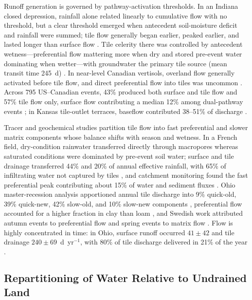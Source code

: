 Runoff generation is governed by pathway-activation thresholds. In an Indiana closed depression, rainfall alone related linearly to cumulative flow with no threshold, but a clear threshold emerged when antecedent soil-moisture deficit and rainfall were summed; tile flow generally began earlier, peaked earlier, and lasted longer than surface flow \parencite{Williams2019}. Tile celerity there was controlled by antecedent wetness---preferential flow mattering more when dry and stored pre-event water dominating when wetter---with groundwater the primary tile source (mean transit time 245~d) \parencite{Williams2021}. In near-level Canadian vertisols, overland flow generally activated before tile flow, and direct preferential flow into tiles was uncommon \parencite{Kokulan2019}. Across 795 US--Canadian events, 43\% produced both surface and tile flow and 57\% tile flow only, surface flow contributing a median 12\% among dual-pathway events \parencite{Macrae2019}; in Kansas tile-outlet terraces, baseflow contributed 38--51\% of discharge \parencite{Stops2022}.

Tracer and geochemical studies partition tile flow into fast preferential and slower matrix components whose balance shifts with season and wetness. In a French field, dry-condition rainwater transferred directly through macropores whereas saturated conditions were dominated by pre-event soil water; surface and tile drainage transferred 44\% and 20\% of annual effective rainfall, with 65\% of infiltrating water not captured by tiles \parencite{Gaillot2023}, and catchment monitoring found the fast preferential peak contributing about 15\% of water and sediment fluxes \parencite{Grangeon2021}. Ohio master-recession analysis apportioned annual tile discharge into 9\% quick-old, 39\% quick-new, 42\% slow-old, and 10\% slow-new components \parencite{Nazari2021}, preferential flow accounted for a higher fraction in clay than loam \parencite{Pluer2020}, and Swedish work attributed autumn events to preferential flow and spring events to matrix flow \parencite{Salazar2011}. Flow is highly concentrated in time: in Ohio, surface runoff occurred $41\pm42$ and tile drainage $240\pm69$~d~yr$^{-1}$, with 80\% of tile discharge delivered in 21\% of the year \parencite{Williams2018}.

\subsection{Repartitioning of Water Relative to Undrained Land}

